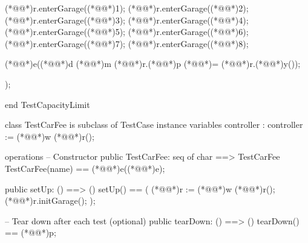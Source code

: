 \documentclass[a4paper]{article}
\begin{document}
\begin{vdm_al}
        (*@@*)r.enterGarage((*@@*)1);
        (*@@*)r.enterGarage((*@@*)2);
        (*@@*)r.enterGarage((*@@*)3);
        (*@@*)r.enterGarage((*@@*)4);
        (*@@*)r.enterGarage((*@@*)5);
        (*@@*)r.enterGarage((*@@*)6);
        (*@@*)r.enterGarage((*@@*)7);
        (*@@*)r.enterGarage((*@@*)8);
        

        (*@@*)e((*@@*)d (*@@*)m (*@@*)r.(*@@*)p (*@\vdmnotcovered{}@*)= (*@@*)r.(*@@*)y());
    
    );

end TestCapacityLimit

class TestCarFee is subclass of TestCase
instance variables
    controller : controller := (*@@*)w (*@@*)r();

operations
    -- Constructor
    public TestCarFee: seq of char ==> TestCarFee
    TestCarFee(name) == (*@@*)e((*@@*)e);

    public setUp: () ==> ()
    setUp() == 
    (
        (*@@*)r := (*@@*)w (*@@*)r();
        (*@@*)r.initGarage();
    );

    -- Tear down after each test (optional)
    public tearDown: () ==> ()
    tearDown() == (*@@*)p;


\end{vdm_al}
\end{document}
